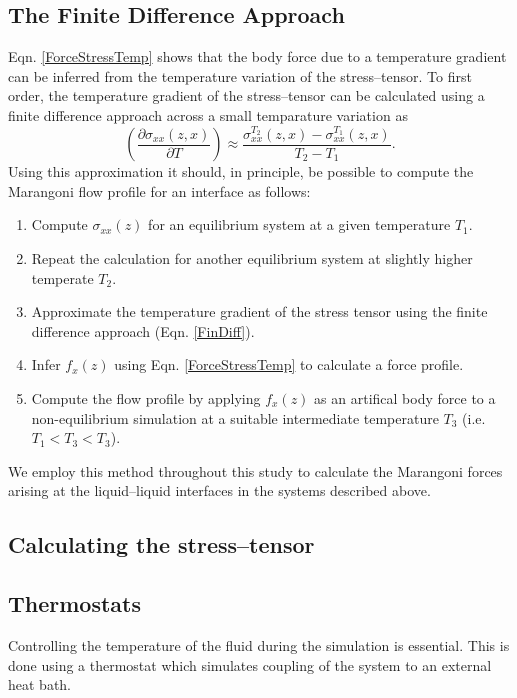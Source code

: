 \subsection{The Finite Difference Approach}
Eqn. \ref{ForceStressTemp} shows that the body force due to a temperature gradient can be inferred from the temperature variation of the stress--tensor. 
To first order, the temperature gradient of the stress--tensor can be calculated using a finite difference approach across a small temparature variation as
\begin{equation}
\label{FinDiff}
\left( \frac{\partial \sigma_{xx}(z,x)}{\partial T} \right) \approx \frac{\sigma_{xx}^{T_{2}}(z,x) - \sigma_{xx}^{T_{1}}(z,x)}{T_{2} - T_{1}}.
\end{equation}
Using this approximation it should, in principle, be possible to compute the Marangoni flow profile for an interface as follows:
\begin{enumerate}
	\item Compute $\sigma_{xx}(z)$ for an equilibrium system at a given temperature $T_{1}$.
	\item Repeat the calculation for another equilibrium system at slightly higher temperate $T_{2}$.
	\item Approximate the temperature gradient of the stress tensor using the finite difference approach (Eqn. \ref{FinDiff}).
	\item Infer $f_{x}(z)$ using Eqn. \ref{ForceStressTemp} to calculate a force profile.
	\item Compute the flow profile by applying $f_{x}(z)$ as an artifical body force to a non-equilibrium simulation at a suitable intermediate temperature $T_{3}$ (i.e. $T_{1} < T_{3} < T_{3}$).
\end{enumerate}

We employ this method throughout this study to calculate the Marangoni forces arising at the liquid--liquid interfaces in the systems described above.

\subsection{Calculating the stress--tensor}\label{CalcStress}

\subsection{Thermostats}
Controlling the temperature of the fluid during the simulation is essential.
This is done using a thermostat which simulates coupling of the system to an external heat bath.

